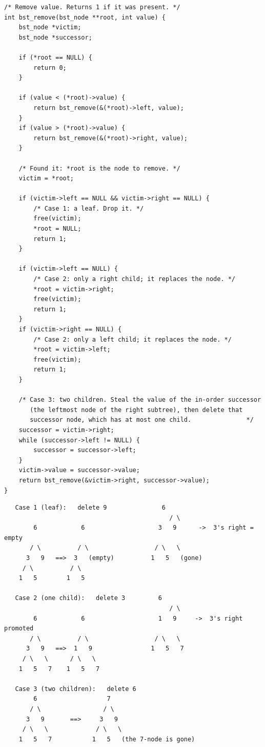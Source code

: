 \begin{lstlisting}[caption={Remove, handling the three structural cases.}]
/* Remove value. Returns 1 if it was present. */
int bst_remove(bst_node **root, int value) {
    bst_node *victim;
    bst_node *successor;

    if (*root == NULL) {
        return 0;
    }

    if (value < (*root)->value) {
        return bst_remove(&(*root)->left, value);
    }
    if (value > (*root)->value) {
        return bst_remove(&(*root)->right, value);
    }

    /* Found it: *root is the node to remove. */
    victim = *root;

    if (victim->left == NULL && victim->right == NULL) {
        /* Case 1: a leaf. Drop it. */
        free(victim);
        *root = NULL;
        return 1;
    }

    if (victim->left == NULL) {
        /* Case 2: only a right child; it replaces the node. */
        *root = victim->right;
        free(victim);
        return 1;
    }
    if (victim->right == NULL) {
        /* Case 2: only a left child; it replaces the node. */
        *root = victim->left;
        free(victim);
        return 1;
    }

    /* Case 3: two children. Steal the value of the in-order successor
       (the leftmost node of the right subtree), then delete that
       successor node, which has at most one child.               */
    successor = victim->right;
    while (successor->left != NULL) {
        successor = successor->left;
    }
    victim->value = successor->value;
    return bst_remove(&victim->right, successor->value);
}
\end{lstlisting}

\begin{verbatim}
   Case 1 (leaf):   delete 9               6
                                             / \
        6            6                    3   9      ->  3's right = empty
       / \          / \                  / \   \
      3   9   ==>  3   (empty)          1   5   (gone)
     / \          / \
    1   5        1   5

   Case 2 (one child):   delete 3         6
                                             / \
        6            6                    1   9     ->  3's right promoted
       / \          / \                  / \   \
      3   9   ==>  1   9                1   5   7
     / \   \      / \   \
    1   5   7    1   5   7

   Case 3 (two children):   delete 6
        6                   7
       / \                 / \
      3   9       ==>     3   9
     / \   \             / \   \
    1   5   7           1   5   (the 7-node is gone)
\end{verbatim}


